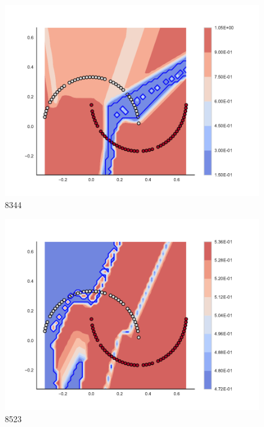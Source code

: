 \begin{subfigure}[b]{0.09\textwidth}
    \includegraphics[clip, trim=2.35cm 1.75cm 4.5cm 0cm,width=\textwidth]{img/convergence/8344.pdf}
    \caption{8344}
    \label{fig:convergence_8344}
\end{subfigure}
%
\begin{subfigure}[b]{0.09\textwidth}
    \includegraphics[clip, trim=2.35cm 1.75cm 4.5cm 0cm,width=\textwidth]{img/convergence/8523.pdf}
    \caption{8523}
    \label{fig:convergence_8523}
\end{subfigure}
%
